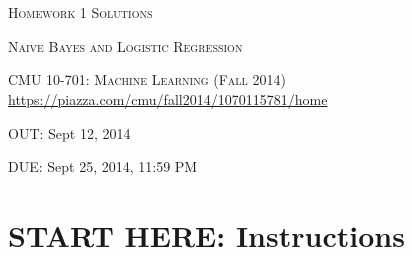 \documentclass{article}
\begin{document}
\section*{}
\begin{center}
  \centerline{\textsc{\LARGE Homework 1{\if{} Solutions \else \fi}}}
  \vspace{0.5em}
  \centerline{\textsc{\Large Naive Bayes and Logistic Regression}}
  \vspace{1em}
  \textsc{\large CMU 10-701: Machine Learning (Fall 2014)} \\
  \url{https://piazza.com/cmu/fall2014/1070115781/home}
  \centerline{OUT: Sept 12, 2014}
  \centerline{DUE: Sept 25, 2014, 11:59 PM}
\end{center}

\if{} \else
\section*{START HERE: Instructions}
\end{document}
